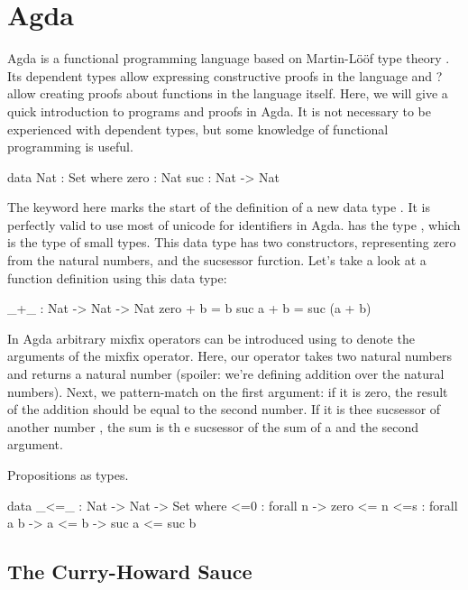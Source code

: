 \chapter{Agda}

	Agda is a functional programming language based on Martin-Lööf type theory
	\cite{?}. Its dependent types allow expressing constructive proofs in the
	language and ? allow creating proofs about functions in the language
	itself. Here, we will give a quick introduction to programs and proofs in
	Agda. It is not necessary to be experienced with dependent types, but some
	knowledge of functional programming is useful.
	
	\begin{code}
	
		data Nat : Set where
			zero : Nat
			suc : Nat -> Nat
	
	\end{code}

	The keyword  here marks the start of the definition of a new
	data type . It is perfectly valid to use most of unicode for
	identifiers in Agda.  has the type , which is the
	type of small types. This data type has two constructors, 
	representing zero from the natural numbers, and  the sucsessor
	furction. Let's take a look at a function definition using this data type:
	
	\begin{code}
	
		_+_ : Nat -> Nat -> Nat
		zero  + b = b
		suc a + b = suc (a + b)

	\end{code}
	
	In Agda arbitrary mixfix operators can be introduced using \codett{\_} to
	denote the arguments of the mixfix operator. Here, our operator
	\codett{\_+\_} takes two natural numbers and returns a natural number
	(spoiler: we're defining addition over the natural numbers). Next, we
	pattern-match on the first argument: if it is zero, the result of the
	addition should be equal to the second number. If it is thee sucsessor of
	another number , the sum is th e sucsessor of the sum of a and
	the second argument.
	

	Propositions as types.
	
	\begin{code}
		
		data _<=_ : Nat -> Nat -> Set where
		    <=0 : forall n -> zero <= n
		    <=s : forall a b -> a <= b -> suc a <= suc b

	\end{code}

	\section{The Curry-Howard Sauce}
